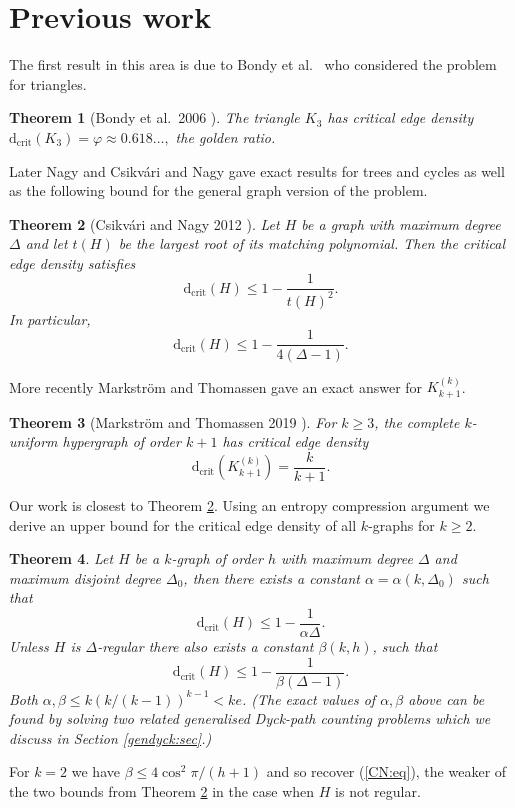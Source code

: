\documentclass[12]{article}
\def\tr{\textrm}
\def\dcrit{\tr{d}_{\tr{crit}}}
\newtheorem{thm}{Theorem}
\begin{document}
\section{Previous work}
The first result in this area is due to Bondy et al.~\cite{BSTT} who considered the problem for triangles.
\begin{thm}[Bondy et al.~2006 \cite{BSTT}]
  The triangle $K_3$ has critical edge density $\dcrit(K_3)=\varphi\approx 0.618\ldots,$ the golden ratio.
\end{thm}
Later Nagy \cite{nagy} and Csikv\'ari and Nagy \cite{CsikvariNagy} gave exact results for trees and cycles as well as the following bound for the general graph version of the problem.
\begin{thm}[Csikv\'ari and Nagy 2012 \cite{CsikvariNagy}]\label{CN:thm}
  Let $H$ be a graph with maximum degree $\Delta$ and let $t(H)$ be the largest root of  its matching polynomial. Then the critical edge density satisfies
  \[
  \dcrit(H)\leq 1-\frac{1}{t(H)^2}.\]
  In particular,\begin{equation}\label{CN:eq}
  \dcrit(H)\leq 1-\frac{1}{4(\Delta-1)}.\end{equation}
 \end{thm} 
More recently Markstr\"om and Thomassen gave an exact answer for $K_{k+1}^{(k)}$. 
\begin{thm}[Markstr\"om and Thomassen 2019 \cite{Markstrom2019}]
  For $k\geq 3$, the complete $k$-uniform hypergraph of order $k+1$ has critical edge density
  \[
 \dcrit(K_{k+1}^{(k)})=\frac{k}{k+1}.\]\end{thm}



Our work is closest to Theorem \ref{CN:thm}. Using an entropy compression argument we derive an upper bound for the critical edge density of all $k$-graphs for $k\geq 2$. 
\begin{thm}\label{main:thm}
  Let $H$ be a $k$-graph of order $h$ with maximum degree $\Delta$ and maximum disjoint degree $\Delta_0$, then there exists a constant $\alpha=\alpha(k,\Delta_0)$ such that\[
  \dcrit(H)\leq 1-\frac{1}{\alpha\Delta}.\]
  Unless $H$ is $\Delta$-regular there also exists a constant $\beta(k,h)$, such that
\[
  \dcrit(H)\leq 1-\frac{1}{\beta(\Delta-1)}.\]
  Both $\alpha,\beta \leq k(k/(k-1))^{k-1}<ke$.   (The exact values of $\alpha,\beta$ above can be found by solving two related generalised Dyck-path counting problems which we discuss in Section \ref{gendyck:sec}.) \end{thm}
For $k=2$ we have $\beta\leq 4\cos^2\pi/(h+1)$ and so recover  (\ref{CN:eq}), the weaker of the two bounds from Theorem \ref{CN:thm} \cite{CsikvariNagy} in the case when $H$ is not regular.
\end{document}
